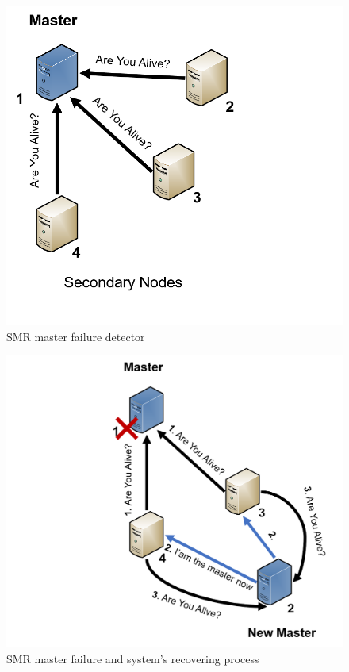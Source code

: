 \documentclass[times, 10pt,twocolumn]{article}
\begin{document}
\begin{figure}
   \includegraphics[width=\linewidth]{smr_ping.png}
   \caption{SMR master failure detector}
   \label{fig:smr_ping}
 \end{figure}

 \begin{figure}
   \includegraphics[width=\linewidth]{smr_master_recover.png}
   \caption{SMR master failure and system's recovering process}
   \label{fig:smr_master_recover}
 \end{figure}
\end{document}
